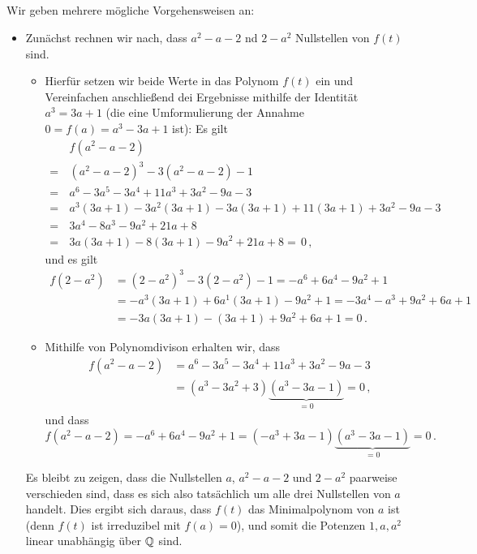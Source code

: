 \subsection{}

Wir geben mehrere mögliche Vorgehensweisen an:

\begin{itemize}
  \item
    Zunächst rechnen wir nach, dass $a^2 - a - 2$ nd $2 - a^2$ Nullstellen von $f(t)$ sind.
    \begin{itemize}
      \item
        Hierfür setzen wir beide Werte in das Polynom $f(t)$ ein und Vereinfachen anschließend dei Ergebnisse mithilfe der Identität $a^3 = 3a + 1$ (die eine Umformulierung der Annahme $0 = f(a) = a^3 - 3a + 1$ ist):
        Es gilt
        \begin{align*}
           &\,  f(a^2 - a - 2)  \\
          =&\,  (a^2 - a - 2)^3 - 3(a^2 - a - 2) - 1  \\
          =&\,  a^6 - 3a^5 - 3a^4 + 11a^3 + 3a^2 - 9a - 3 \\
          =&\,  a^3(3a + 1) - 3a^2(3a + 1) - 3a(3a + 1) + 11(3a + 1) + 3a^2 - 9a - 3  \\
          =&\,  3a^4 - 8a^3 - 9 a^2 + 21a + 8 \\
          =&\,  3a(3a+1) - 8(3a+1) - 9a^2 + 21a + 8
          = \,  0 \,,
        \end{align*}
        und es gilt
        \begin{align*}
                f(2 - a^2)
          &=   (2 - a^2)^3 - 3(2 - a^2) - 1
            =   -a^6 + 6a^4 - 9a^2 + 1  \\
          &=   -a^3(3a+1) + 6a^1(3a+1) - 9a^2 + 1
            =   -3a^4 - a^3 + 9a^2 + 6a + 1 \\
          &=   -3a(3a+1) - (3a+1) + 9a^2 + 6a + 1
            =   0 \,.
        \end{align*}
      \item
        Mithilfe von Polynomdivison erhalten wir, dass
        \begin{align*}
              f(a^2 - a - 2)
          &=  a^6 - 3a^5 - 3a^4 + 11a^3 + 3a^2 - 9a - 3 \\
          &=  (a^3 - 3a^2 + 3)\underbrace{(a^3 - 3a - 1)}_{=0}
          =   0 \,,
        \end{align*}
        und dass
        \[
              f(a^2 - a - 2)
          =  -a^6 + 6a^4 - 9a^2 + 1
          =  (-a^3 + 3a - 1)\underbrace{(a^3 - 3a - 1)}_{=0}
          =   0 \,.
        \]
    \end{itemize}
    Es bleibt zu zeigen, dass die Nullstellen $a$, $a^2 - a - 2$ und $2 - a^2$ paarweise verschieden sind, dass es sich also tatsächlich um alle drei Nullstellen von $a$ handelt.
    Dies ergibt sich daraus, dass $f(t)$ das Minimalpolynom von $a$ ist (denn $f(t)$ ist irreduzibel mit $f(a) = 0$), und somit die Potenzen $1, a, a^2$ linear unabhängig über $\mathbb{Q}$ sind.
    

\end{itemize}
